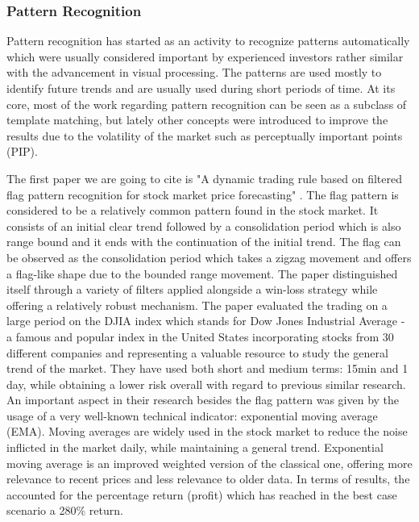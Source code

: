 \subsubsection{Pattern Recognition}

Pattern recognition has started as an activity to recognize patterns automatically which were usually considered important by experienced investors rather similar with the advancement in visual processing. The patterns are used mostly to identify future trends and are usually used during short periods of time. At its core, most of the work regarding pattern recognition can be seen as a subclass of template matching, but lately other concepts were introduced to improve the results due to the volatility of the market such as perceptually important points (PIP).

The first paper we are going to cite is "A dynamic trading rule based on filtered flag pattern recognition for stock market price forecasting" \cite{arevalo2017dynamic}. The flag pattern is considered to be a relatively common pattern found in the stock market. It consists of an initial clear trend followed by a consolidation period which is also range bound and it ends with the continuation of the initial trend. The flag can be observed as the consolidation period which takes a zigzag movement and offers a flag-like shape due to the bounded range movement. The paper distinguished itself through a variety of filters applied alongside a win-loss strategy while offering a relatively robust mechanism. The paper evaluated the trading on a large period on the DJIA index which stands for Dow Jones Industrial Average - a famous and popular index in the United States incorporating stocks from 30 different companies and representing a valuable resource to study the general trend of the market. They have used both short and medium terms: 15min and 1 day, while obtaining a lower risk overall with regard to previous similar research. An important aspect in their research besides the flag pattern was given by the usage of a very well-known technical indicator: exponential moving average (EMA). Moving averages are widely used in the stock market to reduce the noise inflicted in the market daily, while maintaining a general trend. Exponential moving average is an improved weighted version of the classical one, offering more relevance to recent prices and less relevance to older data. In terms of results, the accounted for the percentage return (profit) which has reached in the best case scenario a 280\% return.

